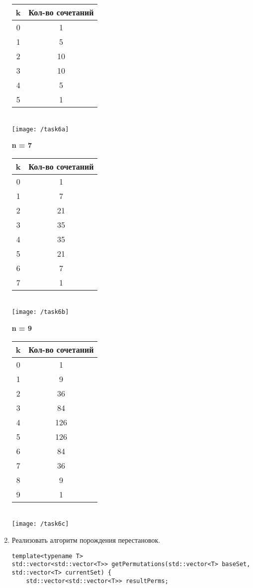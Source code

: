 \documentclass[a4paper,14pt]{extarticle}
\begin{document}
\begin{enumerate}[№1. ]
\begin{center}
\begin{tabular}{c|c}
	\hline
	k&Кол-во сочетаний\\
	\hline
	0&1\\
	\hline
	1&5\\
	\hline
	2&10\\
	\hline
	3&10\\
	\hline
	4&5\\
	\hline
	5&1\\
	\hline
\end{tabular}\\
\texttt{[image: /task6a]}\bigbreak
\end{center}

\textbf{n = 7}\\
\begin{center}
\begin{tabular}{c|c} 
	
	\hline
	k&Кол-во сочетаний\\
	\hline
	0&1\\
	\hline
	1&7\\
	\hline
	2&21\\
	\hline
	3&35\\
	\hline
	4&35\\
	\hline
	5&21\\
	\hline
	6&7\\
	\hline
	7&1\\
	\hline
\end{tabular}\\
\texttt{[image: /task6b]}\bigbreak
\end{center}

\textbf{n = 9}\\
\begin{center}
\begin{tabular}{c|c} 
	
	\hline
	k&Кол-во сочетаний\\
	\hline
	0&1\\
	\hline
	1&9\\
	\hline
	2&36\\
	\hline
	3&84\\
	\hline
	4&126\\
	\hline
	5&126\\
	\hline
	6&84\\
	\hline
	7&36\\
	\hline
	8&9\\
	\hline
	9&1\\
	\hline
\end{tabular}\\
\texttt{[image: /task6c]}
\end{center}
\bigbreak
\item Реализовать алгоритм порождения перестановок.\bigbreak
\begin{verbatim}
template<typename T>
std::vector<std::vector<T>> getPermutations(std::vector<T> baseSet, std::vector<T> currentSet) {
	std::vector<std::vector<T>> resultPerms;
	

\end{verbatim}
\end{enumerate}
\end{document}
